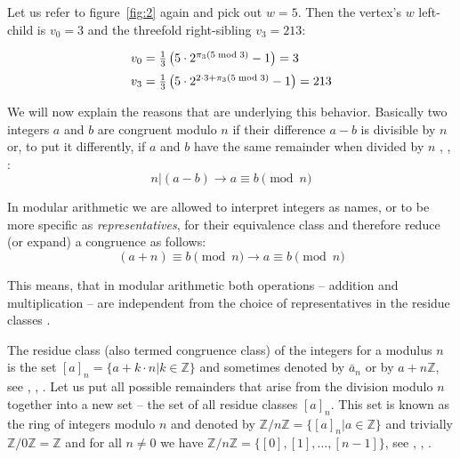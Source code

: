 \begin{example}
\label{ex:siblings}
Let us refer to figure~\ref{fig:2} again and pick out $w=5$. Then the	vertex's $w$ left-child is $v_0=3$ and the threefold right-sibling
$v_3=213$:

\begin{equation*}
\begin{array}{l}
	v_0=\frac{1}{3}\left(5\cdot2^{\pi_3(5\bmod 3)}-1\right)=3
	\\[\medskipamount]
	v_3=\frac{1}{3}\left(5\cdot2^{2\cdot3+\pi_3(5\bmod 3)}-1\right)=213
\end{array}
\end{equation*}
\end{example}

We will now explain the reasons that are underlying this behavior. Basically two integers $a$ and $b$ are congruent modulo $n$ if their difference $a-b$ is divisible by $n$ or, to put it differently, if $a$ and $b$ have the same remainder when divided by $n$ \cite[p.~15]{Ref_Wolfart_2011}, \cite[p.~44]{Ref_Forster_2015}, \cite[p.~19]{Ref_Mueller-Stach_2011}:
\begin{equation}
\label{eq:congruence}
n|(a-b)\rightarrow a\equiv b\pmod n
\end{equation}

In modular arithmetic we are allowed to interpret integers as names, or to be more specific as \textit{representatives}, for their equivalence class and therefore reduce (or expand) a congruence as follows:
\begin{equation}
\label{eq:congruence_reduction}
(a+n)\equiv b\pmod n\rightarrow a\equiv b\pmod n
\end{equation}

This means, that in modular arithmetic both operations -- addition and multiplication -- are independent from the choice of representatives in the residue classes \cite[p.~16]{Ref_Wolfart_2011}.

The residue class (also termed congruence class) of the integers for a modulus $n$ is the set $[a]_n=\{a+k\cdot n|k\in\mathbb{Z}\}$ and sometimes denoted by $\bar a_n$ or by $a+n\mathbb{Z}$, see \cite[p.~15]{Ref_Wolfart_2011}, \cite[p.~120]{Ref_Schubert_2009}, \cite[p.~25]{Ref_Mueller-Stach_2011}. Let us put all possible remainders that arise from the division modulo $n$ together into a new set -- the set of all residue classes $[a]_n$. This set is known as the ring of integers modulo $n$ and denoted by $\mathbb{Z}/n\mathbb{Z}=\{[a]_n|a\in\mathbb{Z}\}$ and trivially $\mathbb{Z}/0\mathbb{Z}=\mathbb{Z}$ and for all $n\ne0$ we have $\mathbb{Z}/n\mathbb{Z}=\{[0],[1],\ldots,[n-1]\}$, see \cite[p.~15]{Ref_Wolfart_2011}, \cite[p.~25]{Ref_Mueller-Stach_2011}, \cite[p.~81]{Ref_Teschl_2013}.


